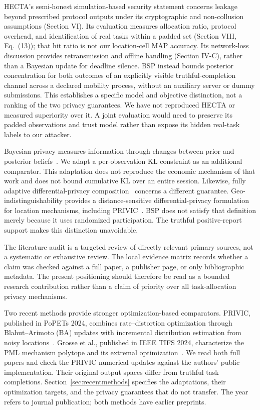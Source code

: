 \documentclass[review,12pt]{elsarticle}
\begin{document}
HECTA's semi-honest simulation-based security statement concerns leakage beyond prescribed protocol outputs under its cryptographic and non-collusion assumptions (Section VI). Its evaluation measures allocation ratio, protocol overhead, and identification of real tasks within a padded set (Section VIII, Eq.~(13)); that hit ratio is not our location-cell MAP accuracy. Its network-loss discussion provides retransmission and offline handling (Section IV-C), rather than a Bayesian update for deadline silence. BSP instead bounds posterior concentration for both outcomes of an explicitly visible truthful-completion channel across a declared mobility process, without an auxiliary server or dummy submissions. This establishes a specific model and objective distinction, not a ranking of the two privacy guarantees. We have not reproduced HECTA or measured superiority over it. A joint evaluation would need to preserve its padded observations and trust model rather than expose its hidden real-task labels to our attacker.

Bayesian privacy measures information through changes between prior and posterior beliefs~\cite{bayesian}. We adapt a per-observation KL constraint as an additional comparator. This adaptation does not reproduce the economic mechanism of that work and does not bound cumulative KL over an entire session. Likewise, fully adaptive differential-privacy composition~\cite{adaptive2023} concerns a different guarantee. Geo-indistinguishability provides a distance-sensitive differential-privacy formulation for location mechanisms, including PRIVIC~\cite{privic2024}. BSP does not satisfy that definition merely because it uses randomized participation. The truthful positive-report support makes this distinction unavoidable.

The literature audit is a targeted review of directly relevant primary sources, not a systematic or exhaustive review. The local evidence matrix records whether a claim was checked against a full paper, a publisher page, or only bibliographic metadata. The present positioning should therefore be read as a bounded research contribution rather than a claim of priority over all task-allocation privacy mechanisms.

Two recent methods provide stronger optimization-based comparators. PRIVIC, published in PoPETs 2024, combines rate--distortion optimization through Blahut--Arimoto (BA) updates with incremental distribution estimation from noisy locations~\cite{privic2024}. Grosse et al., published in IEEE TIFS 2024, characterize the PML mechanism polytope and its extremal optimization~\cite{pml2024}. We read both full papers and check the PRIVIC numerical updates against the authors' public implementation. Their original output spaces differ from truthful task completions. Section~\ref{sec:recentmethods} specifies the adaptations, their optimization targets, and the privacy guarantees that do not transfer. The year refers to journal publication; both methods have earlier preprints.
\end{document}
